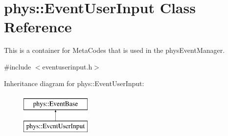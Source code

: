 \hypertarget{classphys_1_1EventUserInput}{
\section{phys::EventUserInput Class Reference}
\label{d7/df5/classphys_1_1EventUserInput}
}


This is a container for MetaCodes that is used in the physEventManager.  




{\ttfamily \#include $<$eventuserinput.h$>$}

Inheritance diagram for phys::EventUserInput:\begin{figure}[H]
\begin{center}
\leavevmode
\includegraphics[height=2cm]{d7/df5/classphys_1_1EventUserInput}
\end{center}
\end{figure}
